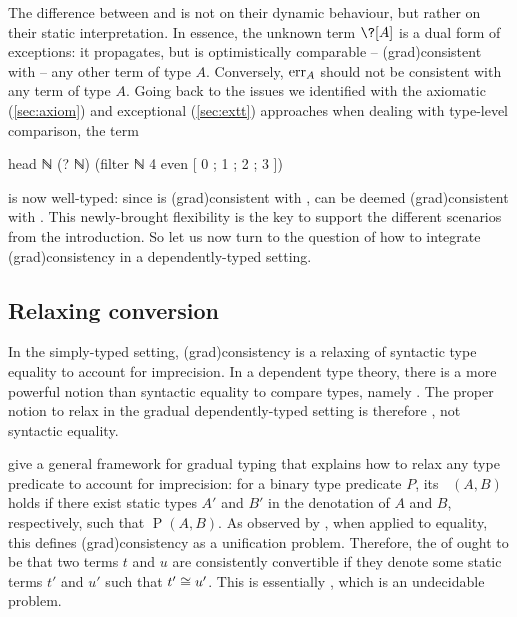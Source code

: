 The difference between  and  is not on their dynamic behaviour,
but rather on their static interpretation.
%
In essence, the unknown term $\?[A]$ is a dual form of exceptions: it
propagates, but is optimistically comparable – \ie \kl(grad){consistent}
with – any other term of type $A$. Conversely, $\err[A]$ should not be consistent
with any term of type $A$.
%
Going back to the issues we identified with the axiomatic (\cref{sec:axiom})
and exceptional (\cref{sec:extt}) approaches when dealing with type-level comparison,
the term
\begin{coqcode}
  head ℕ (? ℕ) (filter ℕ 4 even [ 0 ; 1 ; 2 ; 3 ])
\end{coqcode}
is now well-typed: since  is \kl(grad){consistent} with ,
 can be deemed \kl(grad){consistent} with
.
This newly-brought flexibility is the key to support the different scenarios from the introduction.
%
So let us now turn to the question of how to integrate \kl(grad){consistency} in
a dependently-typed setting.

\subsection{Relaxing conversion}

In the simply-typed setting, \kl(grad){consistency} is a relaxing of syntactic type equality
to account for imprecision.
In a dependent type theory, there is a more powerful notion than syntactic equality to compare types, namely .
The proper notion to relax in the gradual dependently-typed setting is therefore ,
not syntactic equality.

 give a general framework for gradual typing that explains how to relax any type predicate to account for imprecision:
for a binary type predicate $P$, its  $\mathop{\tilde{P}}(A,B)$ holds
if there exist static types $A'$ and $B'$ in the denotation%
of $A$ and $B$, respectively, such that $\mathop{P}(A,B)$.
As observed by , when applied to equality,
this defines \kl(grad){consistency} as a unification problem.
Therefore, the  of  ought to be that two terms
$t$ and $u$ are consistently convertible if they denote some static terms $t'$ and $u'$ such that $t' \cong u'$. This is essentially ,
which is an undecidable problem.

